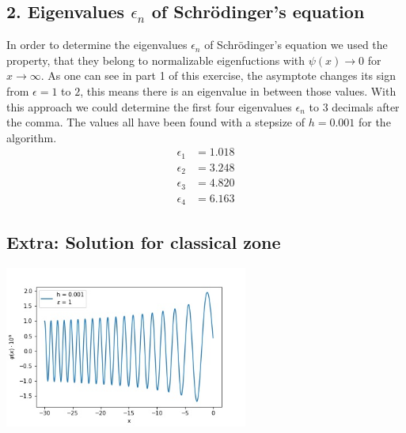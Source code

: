 \documentclass[12pt,a4paper]{article}
\begin{document}
\subsection*{2. Eigenvalues $\epsilon_n$ of Schrödinger's equation}
In order to determine the eigenvalues $\epsilon_n$ of Schrödinger's equation we used the property, that they belong to normalizable eigenfuctions with $\psi(x)\rightarrow0$ for $x\rightarrow\infty$. As one can see in part 1 of this exercise, the asymptote changes its sign from $\epsilon=1$ to $2$, this means there is an eigenvalue in between those values. With this approach we could determine the first four eigenvalues $\epsilon_n$ to 3 decimals after the comma. The values all have been found with a stepsize of $h=0.001$ for the algorithm.
\begin{align*}
\epsilon_1 &= 1.018\\
\epsilon_2 &= 3.248\\
\epsilon_3 &= 4.820\\
\epsilon_4 &= 6.163
\end{align*}
\subsection*{Extra: Solution for classical zone}
\begin{center}
\includegraphics[width=8cm]{partb3.jpg}
\end{center}
\end{document}
